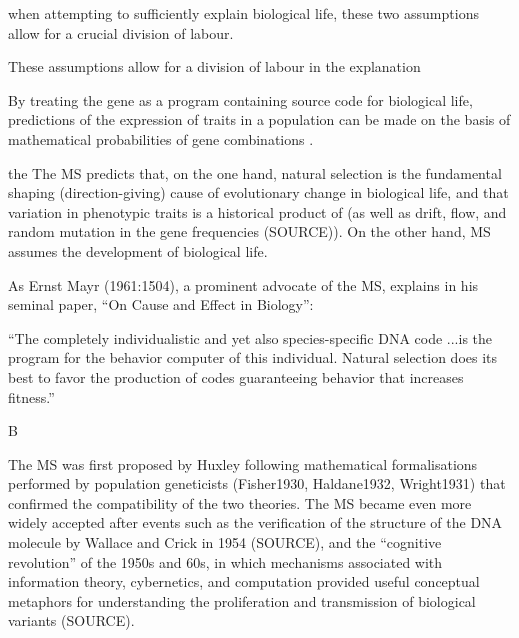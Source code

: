 when attempting to sufficiently explain biological life, these two assumptions allow for a crucial division of labour.



These assumptions allow for a division of labour in the explanation








By treating the gene as a program containing source code for biological life, predictions of the expression of traits in a population can be made on the basis of mathematical probabilities of gene combinations \citep{Dawkins1972;Dawkins1982}.

the  The MS predicts that, on the one hand, natural selection is the fundamental shaping (direction-giving) cause of evolutionary change in biological life, and that variation in phenotypic traits is a historical product of (as well as drift, flow, and random mutation in the gene frequencies (SOURCE)).  On the other hand, MS assumes the development of biological life.







As Ernst Mayr (1961:1504), a prominent advocate of the MS, explains in his seminal paper, ``On Cause and Effect in Biology'':

``The completely individualistic and yet also species-specific DNA code ...is the program for the behavior computer of this individual. Natural selection does its best to favor the production of codes guaranteeing behavior that increases fitness.''

B


The MS was first proposed by Huxley \citep{Huxley1942} following mathematical formalisations performed by population geneticists (Fisher1930, Haldane1932, Wright1931) that confirmed the compatibility of the two theories.  The MS became even more widely accepted after events such as the verification of the structure of the DNA molecule by Wallace and Crick in 1954 (SOURCE), and the ``cognitive revolution'' of the 1950s and 60s, in which mechanisms associated with information theory, cybernetics, and computation provided useful conceptual metaphors for understanding the proliferation and transmission of biological variants (SOURCE).








